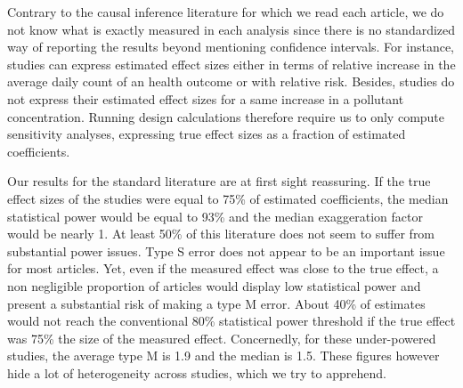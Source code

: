 \documentclass[12pt]{article}
\begin{document}
        
        
        
        Contrary to the causal inference literature for which we read each article, we do not know what is exactly measured in each analysis since there is no standardized way of reporting the results beyond mentioning confidence intervals. For instance, studies can express estimated effect sizes either in terms of relative increase in the average daily count of an health outcome or with relative risk. Besides, studies do not express their estimated effect sizes for a same increase in a pollutant concentration. Running design calculations therefore require us to only compute sensitivity analyses, expressing true effect sizes as a fraction of estimated coefficients.
    

        Our results for the standard literature are at first sight reassuring. If the true effect sizes of the studies were equal to 75\% of estimated coefficients, the median statistical power would be equal to 93\% and the median exaggeration factor would be nearly 1. At least 50\% of this literature does not seem to suffer from substantial power issues. Type S error does not appear to be an important issue for most articles. Yet, even if the measured effect was close to the true effect, a non negligible proportion of articles would display low statistical power and present a substantial risk of making a type M error. About 40\% of estimates would not reach the conventional 80\% statistical power threshold if the true effect was 75\% the size of the measured effect. Concernedly, for these under-powered studies, the average type M is 1.9 and the median is 1.5. These figures however hide a lot of heterogeneity across studies, which we try to apprehend. 
        
\end{document}
